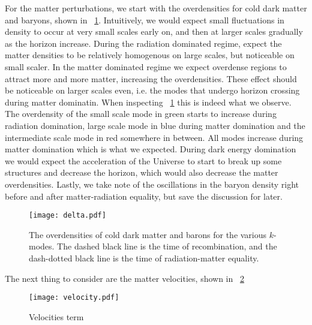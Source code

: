     For the matter perturbations, we start with the overdensities for cold dark matter and baryons, shown in ~\cref{fig:m3:delta}. Intuitively, we would expect small fluctuations in density to occur at very small scales early on, and then at larger scales gradually as the horizon increase. During the radiation dominated regime, expect the matter densities to be relatively homogenous on large scales, but noticeable on small scaler. In the matter dominated regime we expect overdense regions to attract more and more matter, increasing the overdensities. These effect should be noticeable on larger scales even, i.e. the modes that undergo horizon crossing during matter dominatin. When inspecting ~\cref{fig:m3:delta} this is indeed what we observe. The overdensity of the small scale mode in green starts to increase during radiation domination, large scale mode in blue during matter domination and the intermediate scale mode in red somewhere in between. All modes increase during matter domination which is what we expected. During dark energy domination we would expect the acceleration of the Universe to start to break up some structures and decrease the horizon, which would also decrease the matter overdensities. Lastly, we take note of the oscillations in the baryon density right before and after matter-radiation equality, but save the discussion for later. 

    \begin{figure}
        \texttt{[image: delta.pdf]}
        \caption{The overdensities of cold dark matter and barons for the various $k$-modes. The dashed black line is the time of recombination, and the dash-dotted black line is the time of radiation-matter equality.}
        \label{fig:m3:delta}
    \end{figure}

    The next thing to consider are the matter velocities, shown in ~\cref{fig:m3:velocity}

    \begin{figure}
        \texttt{[image: velocity.pdf]}
        \caption{Velocities term}
        \label{fig:m3:velocity}
    \end{figure}


